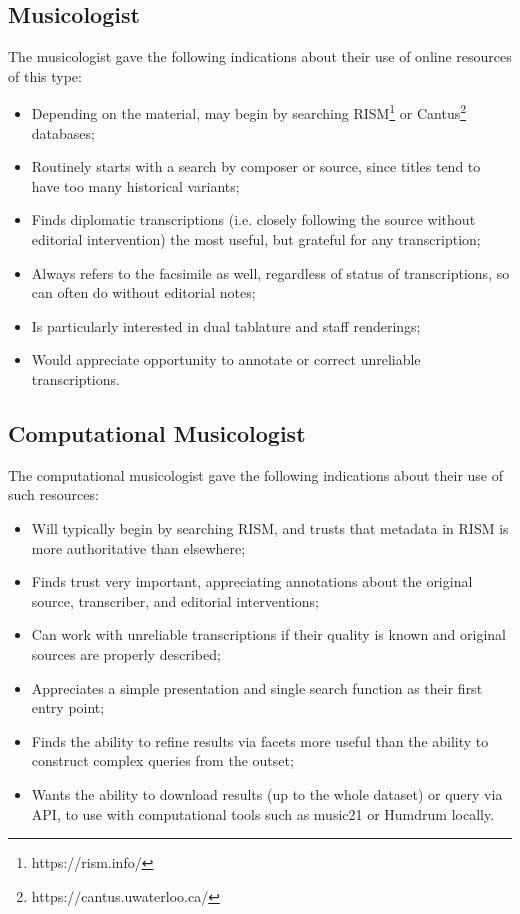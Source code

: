 \documentclass[sigconf, nonacm=true]{acmart}
\begin{document}
\begin{sloppypar}
  \subsection{Musicologist}

  The musicologist gave the following indications about their use of
  online resources of this type:

  \begin{itemize}
    \item Depending on the material, may begin by searching
      RISM\footnote{https://rism.info/} or
      Cantus\footnote{https://cantus.uwaterloo.ca/} databases;
    \item Routinely starts with a search by composer or source, since
      titles tend to have too many historical variants;
    \item Finds diplomatic transcriptions (i.e. closely following
      the source without editorial intervention) the most useful,
      but grateful for any transcription;
    \item Always refers to the facsimile as well, regardless of status
      of transcriptions, so can often do without editorial notes;
    \item Is particularly interested in dual tablature and staff
      renderings;
    \item Would appreciate opportunity to annotate or correct
      unreliable transcriptions.
  \end{itemize}
  
  \subsection{Computational Musicologist}

  The computational musicologist gave the following indications about
  their use of such resources:

  \begin{itemize}
  \item Will typically begin by searching RISM, and trusts that
    metadata in RISM is more authoritative than elsewhere;
  \item Finds trust very important, appreciating annotations about the
    original source, transcriber, and editorial interventions;
  \item Can work with unreliable transcriptions if their quality is
    known and original sources are properly described;
  \item Appreciates a simple presentation and single search function
    as their first entry point;
  \item Finds the ability to refine results via facets more useful
    than the ability to construct complex queries from the outset;
  \item Wants the ability to download results (up to the whole
    dataset) or query via API, to use with computational tools such
    as music21 or Humdrum locally.
  \end{itemize}
  

\end{sloppypar}
\end{document}
